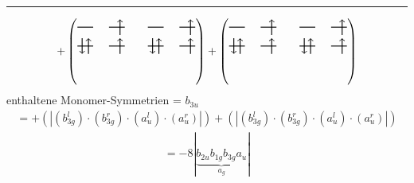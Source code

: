 \documentclass{article}
\begin{document}
\hrule\newpage 
\[ +\left(\text{\begin{tikzpicture}
    \draw[thick] (0,0) -- (0.5,0); %
    \draw[thick] (1,0) -- (1.5,0); %
    \draw[thick] (0,-0.6) -- (0.5,-0.6); %
    \draw[thick] (1,-0.6) -- (1.5,-0.6); %
\draw[->, thick] (1.35, -0.25) -- (1.35, 0.25); 
\draw[-> , thick] (0.35, -0.85) -- (0.35, -0.35); 
\draw[<- , thick] (0.15, -0.85) -- (0.15, -0.35); 
 \draw[-> , thick] (1.35, -0.85) -- (1.35, -0.35); 
\end{tikzpicture}\qquad \begin{tikzpicture}
    \draw[thick] (0,0) -- (0.5,0); %
    \draw[thick] (1,0) -- (1.5,0); %
    \draw[thick] (0,-0.6) -- (0.5,-0.6); %
    \draw[thick] (1,-0.6) -- (1.5,-0.6); %
\draw[->, thick] (1.35, -0.25) -- (1.35, 0.25); 
\draw[-> , thick] (0.35, -0.85) -- (0.35, -0.35); 
\draw[<- , thick] (0.15, -0.85) -- (0.15, -0.35); 
 \draw[-> , thick] (1.35, -0.85) -- (1.35, -0.35); 
\end{tikzpicture}}\right)+\left(\text{\begin{tikzpicture}
    \draw[thick] (0,0) -- (0.5,0); %
    \draw[thick] (1,0) -- (1.5,0); %
    \draw[thick] (0,-0.6) -- (0.5,-0.6); %
    \draw[thick] (1,-0.6) -- (1.5,-0.6); %
\draw[->, thick] (1.35, -0.25) -- (1.35, 0.25); 
\draw[-> , thick] (0.35, -0.85) -- (0.35, -0.35); 
\draw[<- , thick] (0.15, -0.85) -- (0.15, -0.35); 
 \draw[-> , thick] (1.35, -0.85) -- (1.35, -0.35); 
\end{tikzpicture}\qquad \begin{tikzpicture}
    \draw[thick] (0,0) -- (0.5,0); %
    \draw[thick] (1,0) -- (1.5,0); %
    \draw[thick] (0,-0.6) -- (0.5,-0.6); %
    \draw[thick] (1,-0.6) -- (1.5,-0.6); %
\draw[->, thick] (1.35, -0.25) -- (1.35, 0.25); 
\draw[-> , thick] (0.35, -0.85) -- (0.35, -0.35); 
\draw[<- , thick] (0.15, -0.85) -- (0.15, -0.35); 
 \draw[-> , thick] (1.35, -0.85) -- (1.35, -0.35); 
\end{tikzpicture}}\right)\]enthaltene Monomer-Symmetrien = $b_{3u}$\begin{multline*}=+\left(\left|(b_{3g}^{l}) \cdot (b_{3g}^{r}) \cdot (a_{u}^{l}) \cdot (a_{u}^{r})\right|\right)+\left(\left|(b_{3g}^{l}) \cdot (b_{3g}^{r}) \cdot (a_{u}^{l}) \cdot (a_{u}^{r})\right|\right)\end{multline*}
\begin{multline*}
=-8\left|\underbrace{b_{2u} b_{1g} b_{3g} a_{u}}_{a_{g}}\right|
\end{multline*}
\\\\
\end{document}

